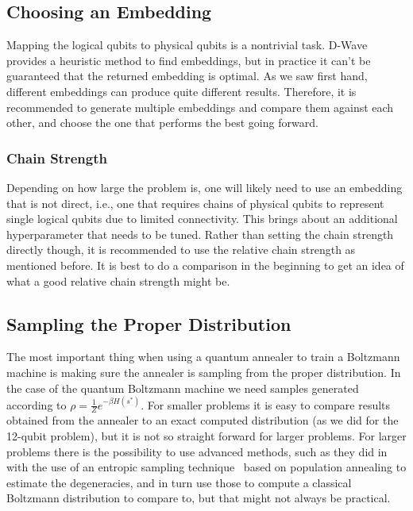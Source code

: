 \subsection{Choosing an Embedding}
Mapping the logical qubits to physical qubits is a nontrivial task.
D-Wave provides a heuristic method to find embeddings, but in practice it can't be guaranteed that the returned embedding is optimal.
As we saw first hand, different embeddings can produce quite different results.
Therefore, it is recommended to generate multiple embeddings and compare them against each other, and choose the one that performs the best going forward.

\subsubsection{Chain Strength}
Depending on how large the problem is, one will likely need to use an embedding that is not direct, i.e., one that requires chains of physical qubits to represent single logical qubits due to limited connectivity.
This brings about an additional hyperparameter that needs to be tuned.
Rather than setting the chain strength directly though, it is recommended to use the relative chain strength as mentioned before.
It is best to do a comparison in the beginning to get an idea of what a good relative chain strength might be.

\subsection{Sampling the Proper Distribution}
The most important thing when using a quantum annealer to train a Boltzmann machine is making sure the annealer is sampling from the proper distribution.
In the case of the quantum Boltzmann machine we need samples generated according to \( \rho = \frac{1}{Z} e^{-\beta H(s^*)} \).
For smaller problems it is easy to compare results obtained from the annealer to an exact computed distribution (as we did for the 12-qubit problem), but it is not so straight forward for larger problems.
For larger problems there is the possibility to use advanced methods, such as they did in~\cite{marshall_2019} with the use of an entropic sampling technique~\cite{barash_2019} based on population annealing to estimate the degeneracies, and in turn use those to compute a classical Boltzmann distribution to compare to, but that might not always be practical.

